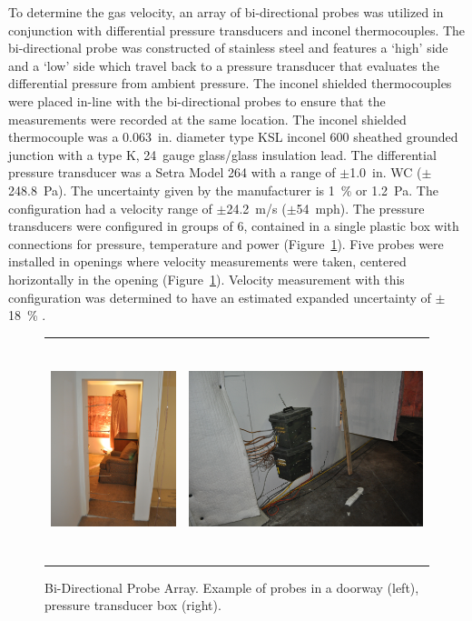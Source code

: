\documentclass[12pt,oneside]{book}
\begin{document}
To determine the gas velocity, an array of bi-directional probes was utilized in conjunction with differential pressure transducers and inconel thermocouples. The bi-directional probe was constructed of stainless steel and features a `high' side and a `low' side which travel back to a pressure transducer that evaluates the differential pressure from ambient pressure. The inconel shielded thermocouples were placed in-line with the bi-directional probes to ensure that the measurements were recorded at the same location. The inconel shielded thermocouple was a 0.063~in. diameter type KSL inconel 600 sheathed grounded junction with a type K, 24~gauge glass/glass insulation lead. The differential pressure transducer was a Setra Model 264 with a range of $\pm$1.0~in. WC ($\pm$248.8~Pa). The uncertainty given by the manufacturer is 1~\% or 1.2~Pa. The configuration had a velocity range of $\pm$24.2~m/s ($\pm$54~mph). The pressure transducers were configured in groups of 6, contained in a single plastic box with connections for pressure, temperature and power (Figure~\ref{fig:BDP}). Five probes were installed in openings where velocity measurements were taken, centered horizontally in the opening (Figure~\ref{fig:BDP}). Velocity measurement with this configuration was determined to have an estimated expanded uncertainty of $\pm$18~\% \cite{BDPInPoolFires}.

\begin{figure}[H]
	\centering
	\begin{tabular}{c c}
		\includegraphics[height = 2.5in]{0_Images/Instrumentation/BDPArray.jpg} &
		\includegraphics[height = 2.5in]{0_Images/Instrumentation/PressureBox.jpg} \\
	\end{tabular}
	\caption{Bi-Directional Probe Array. Example of probes in a doorway (left), pressure transducer box (right).}
	\label{fig:BDP}
\end{figure}
\end{document}
